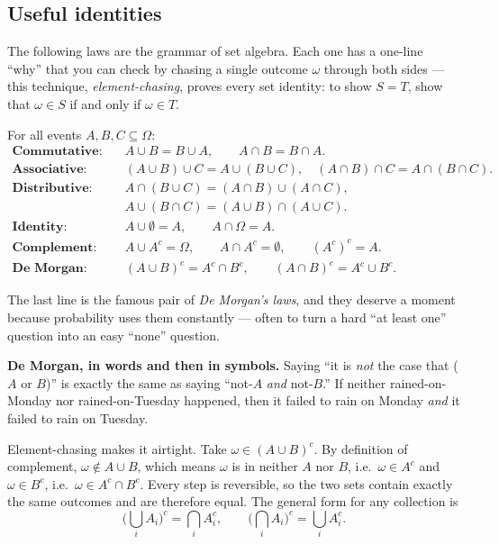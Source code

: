 \subsection{Useful identities}

The following laws are the grammar of set algebra. Each one has a one-line
``why'' that you can check by chasing a single outcome $\omega$ through both
sides --- this technique, \emph{element-chasing}, proves every set identity:
to show $S = T$, show that $\omega \in S$ if and only if $\omega \in T$.

\begin{formalbox}
For all events $A, B, C \subseteq \Omega$:
\begin{align*}
\textbf{Commutative:}\quad & A \cup B = B \cup A, \qquad A \cap B = B \cap A.\\
\textbf{Associative:}\quad & (A \cup B)\cup C = A \cup (B \cup C), \quad
  (A \cap B)\cap C = A \cap (B \cap C).\\
\textbf{Distributive:}\quad & A \cap (B \cup C) = (A\cap B)\cup(A\cap C),\\
  & A \cup (B \cap C) = (A\cup B)\cap(A\cup C).\\
\textbf{Identity:}\quad & A \cup \emptyset = A, \qquad A \cap \Omega = A.\\
\textbf{Complement:}\quad & A \cup A^c = \Omega, \qquad A \cap A^c = \emptyset,
  \qquad (A^c)^c = A.\\
\textbf{De Morgan:}\quad & (A \cup B)^c = A^c \cap B^c, \qquad
  (A \cap B)^c = A^c \cup B^c.
\end{align*}
\end{formalbox}

The last line is the famous pair of \emph{De Morgan's laws}, and they deserve
a moment because probability uses them constantly --- often to turn a hard
``at least one'' question into an easy ``none'' question.

\begin{whybox}
\textbf{De Morgan, in words and then in symbols.} Saying ``it is \emph{not}
the case that ($A$ or $B$)'' is exactly the same as saying ``not-$A$ \emph{and}
not-$B$.'' If neither rained-on-Monday nor rained-on-Tuesday happened, then it
failed to rain on Monday \emph{and} it failed to rain on Tuesday.

Element-chasing makes it airtight. Take $\omega \in (A\cup B)^c$. By
definition of complement, $\omega \notin A \cup B$, which means $\omega$ is in
neither $A$ nor $B$, i.e.\ $\omega \in A^c$ and $\omega \in B^c$, i.e.\
$\omega \in A^c \cap B^c$. Every step is reversible, so the two sets contain
exactly the same outcomes and are therefore equal. The general form for any
collection is
\[
  \Big(\bigcup_i A_i\Big)^c = \bigcap_i A_i^c, \qquad
  \Big(\bigcap_i A_i\Big)^c = \bigcup_i A_i^c.
\]
\end{whybox}

